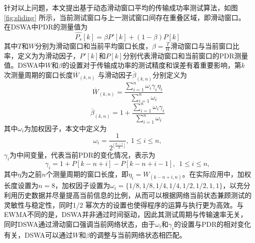 针对以上问题，本文提出基于动态滑动窗口平均的传输成功率测试算法，如图 \ref{fig:sliding} 所示，当前测试窗口与上一测试窗口间存在重叠区域，即滑动窗口。在DSWA中PDR的测量值为
\begin{equation}
 \hat{P_s}[k]=\beta P'[k]+(1-\beta)P[k]
 \label{equa:P_s}
\end{equation}
其中$T$和$W$分别为滑动窗口和当前平均窗口长度，$\beta=\frac{T}{W}$滑动窗口与当前窗口比率，定义为为滑动因子，$P'[k]$和$P[k]$分别代表滑动窗口和当前窗口的PDR测量值。DSWA中$W$和$\beta$的设置对于传输成功率的测试精度和误差有着重要影响，第$k$次测量周期的窗口长度$\overline{W}_{(k,n)}$ 与滑动因子$\overline{\beta}_{(k,n)}$分别定义为
\begin{equation}
  \overline{W}_{(k,n)} = \frac{\sum_{i=1}^n{\omega_i \gamma_i} \eta_{i}}{\sum_{i=1}^n{\omega_i}}
\label{equa:W_s}
\end{equation}
\begin{equation}
  \overline{\beta}_{(k,n)} = 1 + \frac{\sum_{i=1}^n{\omega_i \gamma_i}}{\sum_{i=1}^n{\omega_i}}
\label{equa:beta}
\end{equation}
其中$\omega_i$为加权因子，本文中定义为
\begin{equation}
  \omega_i = \frac{1}{2^{\lfloor\frac{n-i}{2}\rfloor}},~1\leq i \leq n,
\label{equa:omega_i}
\end{equation}
$\gamma_i$为中间变量，代表当前PDR的变化情况，表示为
\begin{equation}
  \gamma_i = 1 + P[k-n+i] - P[k-n+i-1],~~ 1 \leq i \leq n,
\label{equa:gamma_i}
\end{equation}
其中$\eta$为之前$n$个测量周期的窗口长度，即$\eta_i=W_{(k-n+i,n)}$。在实际应用中，加权长度设置为$n=8$，加权因子设置为$\omega_i=\{1/8,1/8,1/4,1/4,1/2,1/2,1,1\}$，以充分利用历史数据并尽量提高当前信息的比例，从而可以根据网络当前状态兼顾测试的灵敏性与稳定性，同时1/2 幂次方的设置也使得程序的运算与执行更为高效。与EWMA不同的是，DSWA并非通过时间驱动，因此其测试周期与传输速率无关，同时DSWA通过滑动窗口强调当前网络状态，由于$\omega_i$和$\gamma_i$的设置与PDR的相对变化有关，DSWA可以通过$W$和$\beta$的调整与当前网络状态相匹配。

